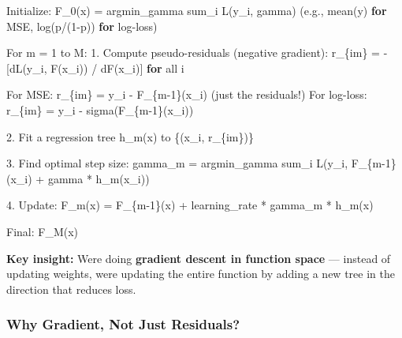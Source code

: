 \documentclass[11pt]{article}
\newenvironment{Shaded}{\begin{snugshade}}{\end{snugshade}}
\newcommand{\BuiltInTok}[1]{\textcolor[rgb]{0.50,0.55,0.55}{#1}}
\newcommand{\ControlFlowTok}[1]{\textcolor[rgb]{0.99,0.74,0.29}{\textbf{#1}}}
\newcommand{\DecValTok}[1]{\textcolor[rgb]{0.96,0.45,0.00}{#1}}
\newcommand{\FloatTok}[1]{\textcolor[rgb]{0.96,0.45,0.00}{#1}}
\newcommand{\NormalTok}[1]{\textcolor[rgb]{0.81,0.81,0.76}{#1}}
\newcommand{\OperatorTok}[1]{\textcolor[rgb]{0.81,0.81,0.76}{#1}}
\begin{document}
\begin{Shaded}
\begin{Highlighting}[]
\NormalTok{Initialize: F\_0(x) }\OperatorTok{=}\NormalTok{ argmin\_gamma sum\_i L(y\_i, gamma)}
\NormalTok{            (e.g., mean(y) }\ControlFlowTok{for}\NormalTok{ MSE, log(p}\OperatorTok{/}\NormalTok{(}\DecValTok{1}\OperatorTok{{-}}\NormalTok{p)) }\ControlFlowTok{for}\NormalTok{ log}\OperatorTok{{-}}\NormalTok{loss)}

\NormalTok{For m }\OperatorTok{=} \DecValTok{1}\NormalTok{ to M:}
    \FloatTok{1.}\NormalTok{ Compute pseudo}\OperatorTok{{-}}\NormalTok{residuals (negative gradient):}
\NormalTok{       r\_\{im\} }\OperatorTok{=} \OperatorTok{{-}}\NormalTok{[dL(y\_i, F(x\_i)) }\OperatorTok{/}\NormalTok{ dF(x\_i)]    }\ControlFlowTok{for} \BuiltInTok{all}\NormalTok{ i}
       
\NormalTok{       For MSE: r\_\{im\} }\OperatorTok{=}\NormalTok{ y\_i }\OperatorTok{{-}}\NormalTok{ F\_\{m}\OperatorTok{{-}}\DecValTok{1}\NormalTok{\}(x\_i)      (just the residuals}\OperatorTok{!}\NormalTok{)}
\NormalTok{       For log}\OperatorTok{{-}}\NormalTok{loss: r\_\{im\} }\OperatorTok{=}\NormalTok{ y\_i }\OperatorTok{{-}}\NormalTok{ sigma(F\_\{m}\OperatorTok{{-}}\DecValTok{1}\NormalTok{\}(x\_i))}
    
    \FloatTok{2.}\NormalTok{ Fit a regression tree h\_m(x) to \{(x\_i, r\_\{im\})\}}
    
    \FloatTok{3.}\NormalTok{ Find optimal step size:}
\NormalTok{       gamma\_m }\OperatorTok{=}\NormalTok{ argmin\_gamma sum\_i L(y\_i, F\_\{m}\OperatorTok{{-}}\DecValTok{1}\NormalTok{\}(x\_i) }\OperatorTok{+}\NormalTok{ gamma }\OperatorTok{*}\NormalTok{ h\_m(x\_i))}
    
    \FloatTok{4.}\NormalTok{ Update:}
\NormalTok{       F\_m(x) }\OperatorTok{=}\NormalTok{ F\_\{m}\OperatorTok{{-}}\DecValTok{1}\NormalTok{\}(x) }\OperatorTok{+}\NormalTok{ learning\_rate }\OperatorTok{*}\NormalTok{ gamma\_m }\OperatorTok{*}\NormalTok{ h\_m(x)}

\NormalTok{Final: F\_M(x)}
\end{Highlighting}
\end{Shaded}

\textbf{Key insight:} We\textquotesingle re doing \textbf{gradient descent in function space} --- instead of updating weights, we\textquotesingle re updating the entire function by adding a new tree in the direction that reduces loss.

\subsubsection{Why Gradient, Not Just Residuals?}\label{why-gradient-not-just-residuals}
\end{document}
